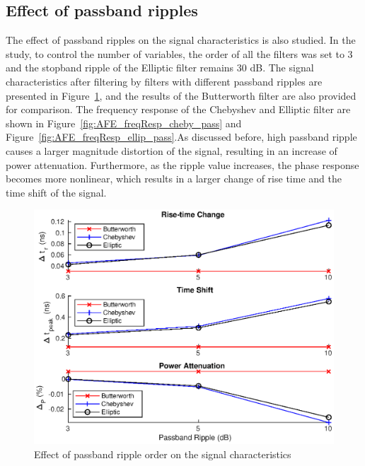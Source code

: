 \subsection{Effect of passband ripples}
The effect of passband ripples on the signal characteristics is also studied. In the study, to control the number of variables, the order of all the filters was set to 3 and the stopband ripple of the Elliptic filter remains 30 dB. The signal characteristics after filtering by filters with different passband ripples are presented in Figure~\ref{fig:AFE_res_rppassEffect}, and the results of the Butterworth filter are also provided for comparison. The frequency response of the Chebyshev and Elliptic filter are shown in Figure~\ref{fig:AFE_freqResp_cheby_pass} and Figure~\ref{fig:AFE_freqResp_ellip_pass}.As discussed before, high passband ripple causes a larger magnitude distortion of the signal, resulting in an increase of power attenuation. Furthermore, as the ripple value increases, the phase response becomes more nonlinear, which results in a larger change of rise time and the time shift of the signal. 
%
\begin{figure}[t!p]
\centering
\includegraphics[width=1\textwidth]{figures/chapter_AFE/Effect_rppass_diff_filter.eps}
\caption{Effect of passband ripple order on the signal characteristics}
\label{fig:AFE_res_rppassEffect}
\end{figure}
%
